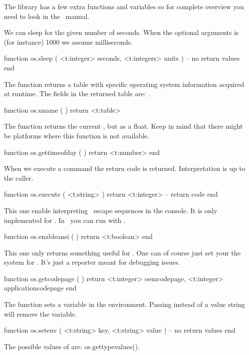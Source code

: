 The  library has a few extra functions and variables so for complete
overview you need to look in the \LUA\ manual.

We can sleep for the given number of seconds. When the optional 
arguments is (for instance) 1000 we assume milliseconds.

\starttyping[option=LUA]
function os.sleep (
    <t:integer>  seconds,
    <t:integers> units
)
    -- no return values
end
\stoptyping

The  function returns a table with specific operating system
information acquired at runtime. The fields in the returned table are:
.

\starttyping[option=LUA]
function os.uname ( )
    return <t:table>
\stoptyping

The  function returns the current ,
but as a float. Keep in mind that there might be platforms where this function is
not available.

\starttyping[option=LUA]
function os.gettimeofday ( )
    return <t:number>
end
\stoptyping

When we execute a command the return code is returned. Interpretation is up to
the caller.

\starttyping[option=LUA]
function os.execute ( <t:string> )
    return <t:integer> -- return code
end
\stoptyping

This one enable interpreting \ANSI\ escape sequences in the console. It is only
implemented for \MSWINDOWS. In \CONTEXT\ you can run with .

\starttyping[option=LUA]
function os.enableansi ( )
    return <t:boolean>
end
\stoptyping

This one only returns something useful for \MSWINDOWS. One can of course just set
your the system for . It's just a reporter meant for debugging issues.

\starttyping[option=LUA]
function os.getcodepage ( )
    return
        <t:integer> oemcodepage,
        <t:integer> applicationcodepage
end
\stoptyping

The  function sets a variable in the environment. Passing
 instead of a value string will remove the variable.

\starttyping[option=LUA]
function os.setenv (
    <t:string> key,
    <t:string> value
)
    -- no return values
end
\stoptyping

The possible values of  are: \showenginekeylist
{os.gettypevalues()}.

